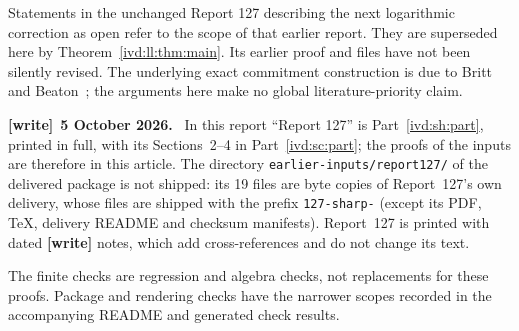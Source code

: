 \documentclass[11pt,letterpaper]{article}
\theoremstyle{remark}\newtheorem{remark}[theorem]{Remark}
\numberwithin{equation}{section}
\newcommand{\file}[1]{\nolinkurl{#1}}
\newenvironment{writenote}[1][]{\par\smallskip\begingroup\small
 \noindent\textbf{[write]}\if\relax\detokenize{#1}\relax\else~\textbf{#1.}\fi\ }%
 {\par\endgroup\smallskip}
\begin{document}
Statements in the unchanged Report 127 describing the next logarithmic
correction as open refer to the scope of that earlier report. They
are superseded here by Theorem~\ref{ivd:ll:thm:main}. Its earlier proof and
files have not been silently revised. The underlying exact commitment
construction is due to Britt and Beaton~\cite{BB}; the arguments here
make no global literature-priority claim.
\begin{writenote}[5 October 2026]
In this report ``Report 127'' is Part~\ref{ivd:sh:part}, printed in full, with its Sections~2--4 in Part~\ref{ivd:sc:part}; the proofs of the inputs are therefore in this article. The directory \file{earlier-inputs/report127/} of the delivered package is not shipped: its 19 files are byte copies of Report~127's own delivery, whose files are shipped with the prefix \file{127-sharp-} (except its PDF, TeX, delivery README and checksum manifests). Report~127 is printed with dated \textbf{[write]} notes, which add cross-references and do not change its text.
\end{writenote}

The finite checks are regression and algebra checks, not replacements for
these proofs. Package and rendering checks have the narrower scopes
recorded in the accompanying README and generated check results.
\end{document}
